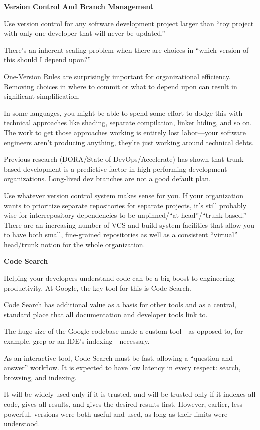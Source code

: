 \item \textbf{Version Control And Branch Management}
\bit
\item Use version control for any software development project larger than ``toy project with only one developer that
will never be updated.''
\item There's an inherent scaling problem when there are choices in ``which version of this should I depend upon?''
\item One-Version Rules are surprisingly important for organizational efficiency. Removing choices in where to commit
or what to depend upon can result in significant simplification.
\item In some languages, you might be able to spend some effort to dodge this with technical approaches like shading,
separate compilation, linker hiding, and so on. The work to get those approaches working is entirely lost labor—your
software engineers aren't producing anything, they're just working around technical debts.
\item Previous research (DORA/State of DevOps/Accelerate) has shown that trunk- based development is a predictive
factor in high-performing development organizations. Long-lived dev branches are not a good default plan.
\item Use whatever version control system makes sense for you. If your organization wants to prioritize separate
repositories for separate projects, it's still probably wise for interrepository dependencies to be unpinned/``at
head''/``trunk based.'' There are an increasing number of VCS and build system facilities that allow you to have both
small, fine-grained repositories as well as a consistent ``virtual'' head/trunk notion for the whole organization. \eit

\item \textbf{Code Search}
\bit
\item Helping your developers understand code can be a big boost to engineering productivity. At Google, the key tool
for this is Code Search.
\item Code Search has additional value as a basis for other tools and as a central, standard place that all
documentation and developer tools link to.
\item The huge size of the Google codebase made a custom tool—as opposed to, for example, grep or an IDE's
indexing—necessary.
\item As an interactive tool, Code Search must be fast, allowing a ``question and answer'' workflow. It is expected
to have low latency in every respect: search, browsing, and indexing.
\item It will be widely used only if it is trusted, and will be trusted only if it indexes all code, gives all
results, and gives the desired results first. However, earlier, less powerful, versions were both useful and used, as
long as their limits were understood.
\eit

